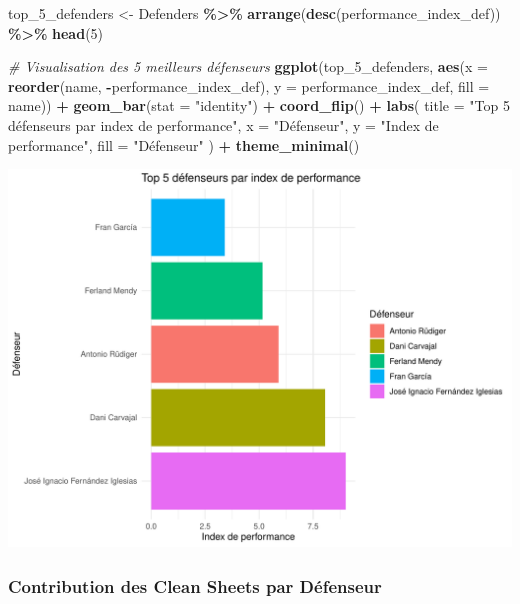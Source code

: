 \documentclass[
  6pt,
]{article}
\newenvironment{Shaded}{\begin{snugshade}}{\end{snugshade}}
\newcommand{\AttributeTok}[1]{\textcolor[rgb]{0.13,0.29,0.53}{#1}}
\newcommand{\CommentTok}[1]{\textcolor[rgb]{0.56,0.35,0.01}{\textit{#1}}}
\newcommand{\DecValTok}[1]{\textcolor[rgb]{0.00,0.00,0.81}{#1}}
\newcommand{\FunctionTok}[1]{\textcolor[rgb]{0.13,0.29,0.53}{\textbf{#1}}}
\newcommand{\NormalTok}[1]{#1}
\newcommand{\OtherTok}[1]{\textcolor[rgb]{0.56,0.35,0.01}{#1}}
\newcommand{\SpecialCharTok}[1]{\textcolor[rgb]{0.81,0.36,0.00}{\textbf{#1}}}
\newcommand{\StringTok}[1]{\textcolor[rgb]{0.31,0.60,0.02}{#1}}
\begin{document}
\begin{Shaded}
\begin{Highlighting}[]
\NormalTok{top\_5\_defenders }\OtherTok{\textless{}{-}}\NormalTok{ Defenders }\SpecialCharTok{\%\textgreater{}\%}
  \FunctionTok{arrange}\NormalTok{(}\FunctionTok{desc}\NormalTok{(performance\_index\_def)) }\SpecialCharTok{\%\textgreater{}\%}
  \FunctionTok{head}\NormalTok{(}\DecValTok{5}\NormalTok{)}

\CommentTok{\# Visualisation des 5 meilleurs défenseurs}
\FunctionTok{ggplot}\NormalTok{(top\_5\_defenders, }\FunctionTok{aes}\NormalTok{(}\AttributeTok{x =} \FunctionTok{reorder}\NormalTok{(name, }\SpecialCharTok{{-}}\NormalTok{performance\_index\_def), }\AttributeTok{y =}\NormalTok{ performance\_index\_def, }\AttributeTok{fill =}\NormalTok{ name)) }\SpecialCharTok{+}
  \FunctionTok{geom\_bar}\NormalTok{(}\AttributeTok{stat =} \StringTok{"identity"}\NormalTok{) }\SpecialCharTok{+}
  \FunctionTok{coord\_flip}\NormalTok{() }\SpecialCharTok{+}
  \FunctionTok{labs}\NormalTok{(}
    \AttributeTok{title =} \StringTok{"Top 5 défenseurs par index de performance"}\NormalTok{,}
    \AttributeTok{x =} \StringTok{"Défenseur"}\NormalTok{,}
    \AttributeTok{y =} \StringTok{"Index de performance"}\NormalTok{,}
    \AttributeTok{fill =} \StringTok{"Défenseur"}
\NormalTok{  ) }\SpecialCharTok{+}
  \FunctionTok{theme\_minimal}\NormalTok{()}
\end{Highlighting}
\end{Shaded}

\begin{center}\includegraphics[width=0.8\linewidth]{Analyse_Impact_Performances_Joueurs_files/figure-latex/Top5-def-1} \end{center}

\subsubsection{Contribution des Clean Sheets par
Défenseur}\label{contribution-des-clean-sheets-par-duxe9fenseur}
\end{document}
